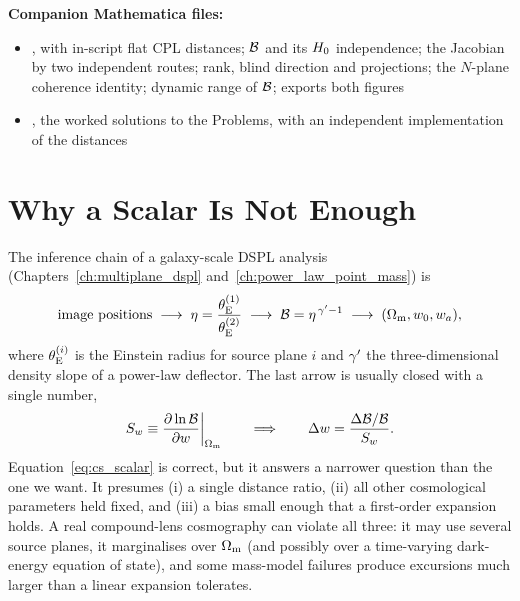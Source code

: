 \medskip
\noindent
\textbf{Companion Mathematica files:}
\begin{itemize}[nosep]
    \item {},
          with in-script flat CPL distances; $\mathcal{B}$ and its $H_0$
          independence; the Jacobian by two independent routes; rank,
          blind direction and projections; the $N$-plane coherence
          identity; dynamic range of $\mathcal{B}$; exports both figures
    \item {},
          the worked solutions to the Problems, with an independent
          implementation of the distances
\end{itemize}


\section{Why a Scalar Is Not Enough}
\label{sec:cs_why}

The inference chain of a galaxy-scale DSPL analysis
(Chapters~\ref{ch:multiplane_dspl} and~\ref{ch:power_law_point_mass}) is
\begin{equation}
  \text{image positions}\;\longrightarrow\;
  \eta=\frac{\theta_{\mathrm{E}}^{(1)}}{\theta_{\mathrm{E}}^{(2)}}
  \;\longrightarrow\;\mathcal{B}=\eta^{\,\gamma'-1}
  \;\longrightarrow\;(\Omega_{\mathrm{m}},w_0,w_a),
  \label{eq:cs_chain}
\end{equation}
where $\theta_{\mathrm{E}}^{(i)}$ is the Einstein radius for source plane $i$ and
$\gamma'$ the three-dimensional density slope of a power-law deflector. The
last arrow is usually closed with a single number,
\begin{equation}
  S_w\equiv\frac{\partial \ln\mathcal{B}}{\partial w}\bigg|_{\Omega_{\mathrm{m}}}
  \qquad\Longrightarrow\qquad
  \Delta w=\frac{\Delta\mathcal{B}/\mathcal{B}}{S_w}.
  \label{eq:cs_scalar}
\end{equation}
Equation~\eqref{eq:cs_scalar} is correct, but it answers a narrower
question than the one we want. It presumes
(i) a single distance ratio,
(ii) all other cosmological parameters held fixed, and
(iii) a bias small enough that a first-order expansion holds.
A real compound-lens cosmography can violate all three: it may use
several source planes, it marginalises over $\Omega_{\mathrm{m}}$ (and possibly over
a time-varying dark-energy equation of state), and some mass-model
failures produce excursions much larger than a linear expansion
tolerates.

